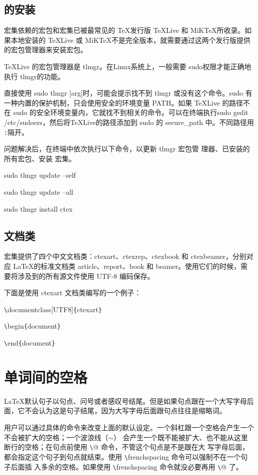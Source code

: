 \documentclass[UTF8]{ctexart}
\begin{document}
\subsection{\CTeX 的安装}
   \CTeX 宏集依赖的宏包和宏集已被最常见的 \TeX 发行版 \TeX Live 和 MiK\TeX 所收录。如果本地安装的 \TeX Live 或
   MiK\TeX 不是完全版本，就需要通过这两个发行版提供的宏包管理器来安装宏包。

   \TeX Live 的宏包管理器是 tlmgr。在Linux系统上，一般需要 sudo权限才能正确地执行
   tlmgr的功能。

直接使用 sudo tlmgr [arg]时，可能会提示找不到 tlmgr 或没有这个命令。sudo 有一种内置的保护机制，只会使用安全的环境变量 PATH。如果 \TeX Live 的路径不在
sudo 的安全环境变量内，它就找不到相关的命令。可以在终端执行sudo gedit /etc/sudoers，然后将\TeX Live的路径添加到 sudo 的
secure\_path 中。不同路径用 \texttt{:}隔开。

问题解决后，在终端中依次执行以下命令，以更新 tlmgr 宏包管
理器、已安装的所有宏包、安装 \CTeX 宏集。

    sudo tlmgr update --self

    sudo tlmgr update --all

    sudo tlmgr install ctex
\subsection{\CTeX 文档类}
\CTeX 宏集提供了四个中文文档类：ctexart、ctexrep、ctexbook 和
ctexbeamer，分别对应 \LaTeX 的标准文档类 article、report、book 和
beamer。使用它们的时候，需要将涉及到的所有源文件使用 UTF-8 编码保存。

下面是使用 ctexart 文档类编写的一个例子：

    \texttt{\textbackslash}documentclass[UTF8]\texttt{\{}ctexart\texttt{\}}

    \texttt{\textbackslash}begin\texttt{\{}document\texttt{\}}

    \texttt{\textbackslash}end\texttt{\{}document\texttt{\}}
\section{单词间的空格}
\LaTeX 默认句子以句点、问号或者感叹号结尾。但是如果句点跟在一个大写字母后面，它不会认为这是句子结尾，因为大写字母后面跟句点往往是缩略词。

用户可以通过具体的命令来改变上面的默认设定。一个斜杠跟一个空格会产生一个不会被扩大的空格；一个波浪线（\texttt{$\sim$}）
会产生一个既不能被扩大、也不能从这里断行的空格；在句点前使用 \texttt{\textbackslash}@ 命令，不管这个句点是不是跟在大
写字母后面，都会指定这个句子到句点就结束。使用 \texttt{\textbackslash}frenchspacing 命令可以强制不在一个句子后面插
入多余的空格。如果使用 \texttt{\textbackslash}frenchspacing 命令就没必要再用 \texttt{\textbackslash}@ 了。
\end{document}
